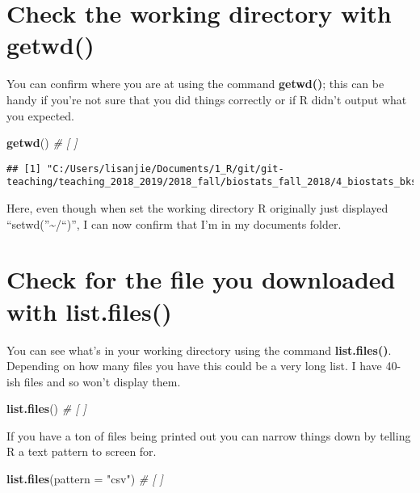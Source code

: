 \documentclass[]{book}
\newenvironment{Shaded}{\begin{snugshade}}{\end{snugshade}}
\newcommand{\KeywordTok}[1]{\textcolor[rgb]{0.13,0.29,0.53}{\textbf{#1}}}
\newcommand{\DataTypeTok}[1]{\textcolor[rgb]{0.13,0.29,0.53}{#1}}
\newcommand{\StringTok}[1]{\textcolor[rgb]{0.31,0.60,0.02}{#1}}
\newcommand{\CommentTok}[1]{\textcolor[rgb]{0.56,0.35,0.01}{\textit{#1}}}
\newcommand{\NormalTok}[1]{#1}
\theoremstyle{definition}
\theoremstyle{definition}
\theoremstyle{definition}
\theoremstyle{remark}
\begin{document}
\section{Check the working directory with
getwd()}\label{check-the-working-directory-with-getwd}

You can confirm where you are at using the command \textbf{getwd()};
this can be handy if you're not sure that you did things correctly or if
R didn't output what you expected.

\begin{Shaded}
\begin{Highlighting}[]
\KeywordTok{getwd}\NormalTok{() }\CommentTok{# [ ]}
\end{Highlighting}
\end{Shaded}

\begin{verbatim}
## [1] "C:/Users/lisanjie/Documents/1_R/git/git-teaching/teaching_2018_2019/2018_fall/biostats_fall_2018/4_biostats_bks_pkg/EDS/EDSbook"
\end{verbatim}

Here, even though when set the working directory R originally just
displayed ``setwd(''\textasciitilde{}/``)'', I can now confirm that I'm
in my documents folder.

\section{Check for the file you downloaded with
list.files()}\label{check-for-the-file-you-downloaded-with-list.files}

You can see what's in your working directory using the command
\textbf{list.files()}. Depending on how many files you have this could
be a very long list. I have 40-ish files and so won't display them.

\begin{Shaded}
\begin{Highlighting}[]
\KeywordTok{list.files}\NormalTok{() }\CommentTok{# [ ]}
\end{Highlighting}
\end{Shaded}

If you have a ton of files being printed out you can narrow things down
by telling R a text pattern to screen for.

\begin{Shaded}
\begin{Highlighting}[]
\KeywordTok{list.files}\NormalTok{(}\DataTypeTok{pattern =} \StringTok{"csv"}\NormalTok{) }\CommentTok{# [ ]}
\end{Highlighting}
\end{Shaded}
\end{document}
